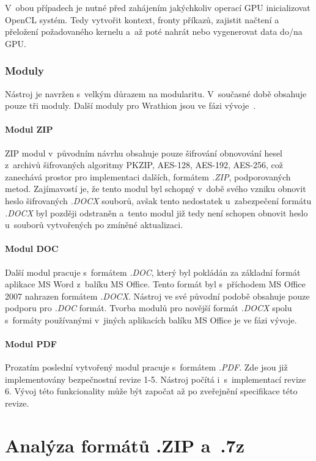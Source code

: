 V~obou případech je nutné před zahájením jakýchkoliv operací GPU inicializovat \linebreak OpenCL
systém. Tedy vytvořit kontext, fronty příkazů, zajistit načtení a přeložení požadovaného kernelu
a~až poté nahrát nebo vygenerovat data do/na GPU.

\subsection{Moduly}
Nástroj je navržen s~velkým důrazem na modularitu. V~současné době obsahuje pouze tři moduly.
Další moduly pro Wrathion jsou ve fázi vývoje~\cite{Hranicky}.

\subsubsection{Modul ZIP}
ZIP modul v~původním návrhu obsahuje pouze šifrování obnovování hesel z~archivů šifrovaných
algoritmy PKZIP, AES-128, AES-192, AES-256, což zanechává prostor pro implementaci dalších, formátem
{\it .ZIP}, podporovaných metod. Zajímavostí je, že tento modul byl schopný v~době svého vzniku
obnovit heslo šifrovaných {\it .DOCX} souborů, avšak tento nedostatek u~zabezpečení formátu {\it
.DOCX} byl později odstraněn a~tento modul již tedy není schopen obnovit heslo u~souborů vytvořených
po zmíněné aktualizaci.

\subsubsection{Modul DOC}
Další modul pracuje s~formátem {\it .DOC}, který byl pokládán za základní formát aplikace MS Word
z~balíku MS Office. Tento formát byl s~příchodem MS Office 2007 nahrazen formátem {\it .DOCX}.
Nástroj ve své původní podobě obsahuje pouze podporu pro {\it .DOC} formát. Tvorba modulů pro
novější formát {\it .DOCX} spolu s~formáty používanými v~jiných aplikacích balíku MS Office je ve
fázi vývoje.

\subsubsection{Modul PDF}
Prozatím poslední vytvořený modul pracuje s~formátem {\it .PDF}. Zde jsou již implementovány
bezpečnostní revize 1-5. Nástroj počítá i~s~implementací revize 6. Vývoj této funkcionality může
být započat až po zveřejnění specifikace této revize.


\chapter{Analýza formátů .ZIP a~.7z}
\label{ch:formaty}
